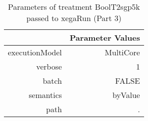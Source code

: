 \begin{table}[ht]
\centering
\begin{tabular}{rr}
  \hline
 & Parameter Values \\ 
  \hline
executionModel & MultiCore \\ 
  verbose & 1 \\ 
  batch & FALSE \\ 
  semantics & byValue \\ 
  path & . \\ 
   \hline
\end{tabular}
\caption{ Parameters of treatment BoolT2sgp5k passed to xegaRun
 (Part 3)} 
\end{table}
